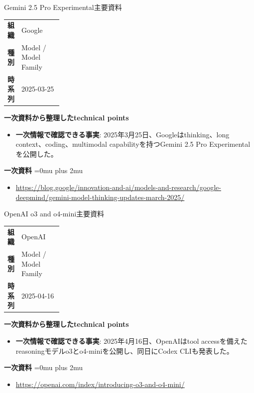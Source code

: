 \begin{technicalnote}{Gemini 2.5 Pro Experimental}{主要資料}
\begingroup
\begin{tabularx}{\linewidth}{@{}>{\bfseries}p{0.22\linewidth}X@{}}
組織 & Google \\
種別 & Model / Model Family \\
時系列 & 2025-03-25 \\
\end{tabularx}
\smallskip
{\bfseries 一次資料から整理したtechnical points}
\begin{itemize}[leftmargin=1.5em,itemsep=0.35em]
\item \textbf{一次情報で確認できる事実}: 2025年3月25日、Googleはthinking、long context、coding、multimodal capabilityを持つGemini 2.5 Pro Experimentalを公開した。
\end{itemize}
\begin{samepage}
{\bfseries 一次資料}
\begingroup\sloppy
\Urlmuskip=0mu plus 2mu\relax
\begin{itemize}[leftmargin=1.5em,itemsep=0.25em]
\item {\scriptsize\url{https://blog.google/innovation-and-ai/models-and-research/google-deepmind/gemini-model-thinking-updates-march-2025/}}
\end{itemize}
\endgroup
\end{samepage}
\endgroup
\end{technicalnote}
\medskip

\begin{technicalnote}{OpenAI o3 and o4-mini}{主要資料}
\begingroup
\begin{tabularx}{\linewidth}{@{}>{\bfseries}p{0.22\linewidth}X@{}}
組織 & OpenAI \\
種別 & Model / Model Family \\
時系列 & 2025-04-16 \\
\end{tabularx}
\smallskip
{\bfseries 一次資料から整理したtechnical points}
\begin{itemize}[leftmargin=1.5em,itemsep=0.35em]
\item \textbf{一次情報で確認できる事実}: 2025年4月16日、OpenAIはtool accessを備えたreasoningモデルo3とo4-miniを公開し、同日にCodex CLIも発表した。
\end{itemize}
\begin{samepage}
{\bfseries 一次資料}
\begingroup\sloppy
\Urlmuskip=0mu plus 2mu\relax
\begin{itemize}[leftmargin=1.5em,itemsep=0.25em]
\item {\scriptsize\url{https://openai.com/index/introducing-o3-and-o4-mini/}}
\end{itemize}
\endgroup
\end{samepage}
\endgroup
\end{technicalnote}
\medskip

